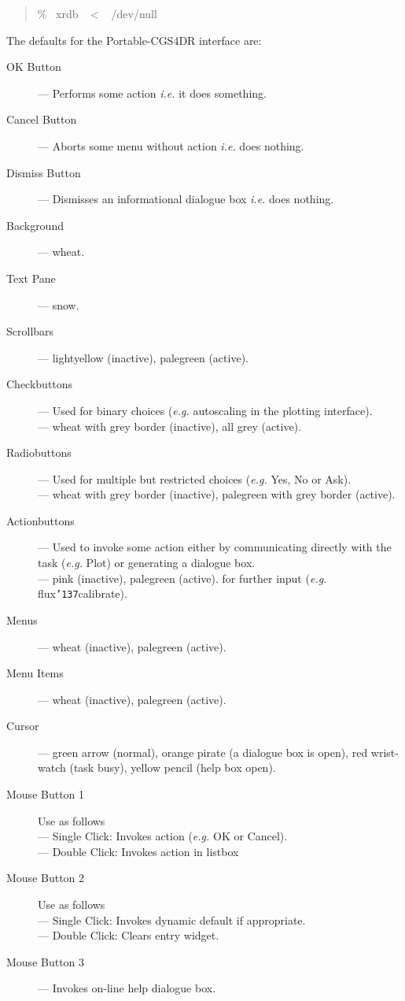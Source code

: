 \documentclass[a4paper]{book}
\renewcommand{\_}{{\tt\char'137}}
\begin{document}
\begin{quote}
 \% \ xrdb \ $<$ \ /dev/null
\end{quote}

The defaults for the Portable-CGS4DR interface are:
\begin{description}
\item[{\sf OK Button}] --- Performs some action {\em i.e.} it does something.
\item[{\sf Cancel Button}] --- Aborts some menu without action {\em i.e.} does nothing.
\item[{\sf Dismiss Button}] --- Dismisses an informational dialogue box {\em i.e.} does nothing.
\item[{\sf Background}] --- wheat.
\item[{\sf Text Pane}] --- snow.
\item[{\sf Scrollbars}] --- lightyellow (inactive), palegreen (active).
\item[{\sf Checkbuttons}] --- Used for binary choices ({\em e.g.} autoscaling in the plotting interface). \\
 --- wheat with grey border (inactive), all grey (active).
\item[{\sf Radiobuttons}] --- Used for multiple but restricted choices
({\em e.g.} {\sf Yes}, {\sf No} or {\sf Ask}). \\
 --- wheat with grey border (inactive), palegreen with grey border (active).
\item[{\sf Actionbuttons}] --- Used to invoke some action
  either by communicating directly with the task ({\em e.g.} Plot) or
  generating a dialogue box. \\
  --- pink (inactive), palegreen (active).
for further input ({\em e.g.} flux\_calibrate).
\item[{\sf Menus}] --- wheat (inactive), palegreen (active).
\item[{\sf Menu Items}] --- wheat (inactive), palegreen (active).
\item[{\sf Cursor}] --- green arrow (normal), orange pirate (a dialogue box is open), red wrist-watch (task busy), yellow pencil (help box open).
\item[{\sf Mouse Button 1}] Use as follows \\
  --- Single Click: Invokes action ({\em e.g.} OK or Cancel). \\
  --- Double Click: Invokes action in listbox
\item[{\sf Mouse Button 2}] Use as follows \\
  --- Single Click: Invokes dynamic default if appropriate. \\
  --- Double Click: Clears entry widget.
\item[{\sf Mouse Button 3}] --- Invokes on-line help dialogue box.
\end{description}
\end{document}
